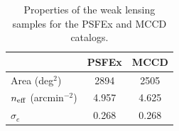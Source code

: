 \begin{table}[h!]
\centering
\begin{tabular}{lcc}
\hline
\hline
 & \textbf{PSFEx} & \textbf{MCCD} \\
\hline
Area (deg$^2$) & 2894 & 2505 \\
$n_{\rm eff}$ (arcmin$^{-2}$) & 4.957 & 4.625 \\
$\sigma_e$ & 0.268 & 0.268 \\
\hline
\end{tabular}
\caption{Properties of the weak lensing samples for the PSFEx and MCCD catalogs.}
\label{tab:sample_properties}
\end{table}
